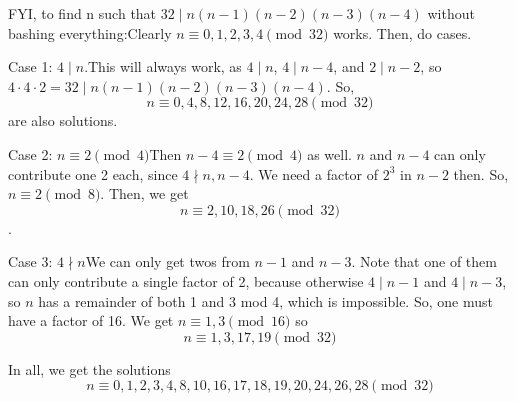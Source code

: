 \begin{enumerate}
 FYI, to find n such that $32 \mid n(n-1)(n-2)(n-3)(n-4)$ without bashing everything:Clearly $n \equiv 0, 1, 2, 3, 4 \pmod{32}$ works. Then, do cases.

 Case 1: $4 \mid n$.This will always work, as $4 \mid n$, $4 \mid n-4$, and $2 \mid n-2$, so $4 \cdot 4 \cdot 2 = 32 \mid n(n-1)(n-2)(n-3)(n-4)$. So, 
 \[n \equiv 0, 4, 8, 12, 16, 20, 24, 28 \pmod{32}\]are also solutions.

 Case 2: $n \equiv 2 \pmod{4}$Then $n-4 \equiv 2 \pmod{4}$ as well. $n$ and $n-4$ can only contribute one 2 each, since $4 \nmid n, n-4$. We need a factor of $2^3$ in $n-2$ then. So, $n \equiv 2 \pmod{8}$. Then, we get 
 \[n \equiv 2, 10, 18, 26 \pmod{32}\].

 Case 3: $4 \nmid n$We can only get twos from $n-1$ and $n-3$. Note that one of them can only contribute a single factor of 2, because otherwise $4 \mid n-1$ and $4 \mid n-3$, so $n$ has a remainder of both 1 and 3 mod 4, which is impossible. So, one must have a factor of 16. We get $n \equiv 1, 3 \pmod{16}$ so 
 \[n \equiv 1, 3, 17, 19 \pmod{32}\]

 In all, we get the solutions
 \[n \equiv 0, 1, 2, 3, 4, 8, 10, 16, 17, 18, 19, 20, 24, 26, 28 \pmod{32}\]



\end{enumerate}